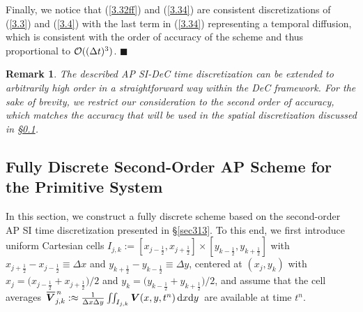 \documentclass[A4paper,12pt,twoside]{article}
\newtheorem{remark}{Remark}[section]
\newenvironment{proof}{{\flushleft \bf Proof:}}{}
\numberwithin{equation}{section}
\numberwithin{figure}{section}
\numberwithin{table}{section}
\def\bnabla{\bm{\nabla}}
\newcommand{\dt}{\Delta t}
\newcommand{\dx}{\Delta x}
\newcommand{\dy}{\Delta y}
\newcommand{\kph}{{k+\frac{1}{2}}}
\newcommand{\kmh}{{k-\frac{1}{2}}}
\newcommand{\jph}{{j+\frac{1}{2}}}
\newcommand{\jmh}{{j-\frac{1}{2}}}
\newcommand\eref[1]{(\ref{#1})}
\newcommand*\xbar[1]{%
  \hbox{%
    \vbox{%
      \hrule height 0.5pt %
      \kern0.4ex%
      \hbox{%
        \kern-0.05em%
        \ensuremath{#1}%
        \kern-0.00em%
      }%
    }%
  }%
}
\begin{document}
\begin{proof}
Finally, we notice that \eref{3.32ff} and \eref{3.34} are consistent discretizations of \eref{3.3} and \eref{3.4} with the last term in
\eref{3.34} representing a temporal diffusion, which is consistent with the order of accuracy of the scheme and thus proportional to
${\cal O}((\dt)^3)$.
\hfill$\blacksquare$
\end{proof}
\begin{remark}
The described AP SI-DeC time discretization can be extended to arbitrarily high order in a straightforward way within the DeC framework. 
For the sake of brevity, we restrict our consideration to the second order of accuracy, which matches the accuracy that will be used in the
spatial discretization discussed in \S\ref{sec32}.
\end{remark}

\subsection{Fully Discrete Second-Order AP Scheme for the Primitive System}\label{sec32}
In this section, we construct a fully discrete scheme based on the second-order AP SI time discretization presented in \S\ref{sec313}. To
this end, we first introduce uniform Cartesian cells $I_{j,k}:=[x_\jmh,x_\jph]\times[y_\kmh,y_\kph]$ with $x_\jph-x_\jmh\equiv\dx$ and
$y_\kph-y_\kmh\equiv\dy$, centered at $(x_j,y_k)$ with $x_j=\big(x_\jmh+x_\jph\big)/2$ and $y_k=\big(y_\kmh+y_\kph\big)/2$, and assume that
the cell averages $\,\xbar{\bm V}_{j,k}^{\,n}:\approx\frac{1}{\dx\dy}\iint_{I_{j,k}}\bm V(x,y,t^n)\,{\rm d}x{\rm d}y\,$ are available at
time $t^n$.
\end{document}
